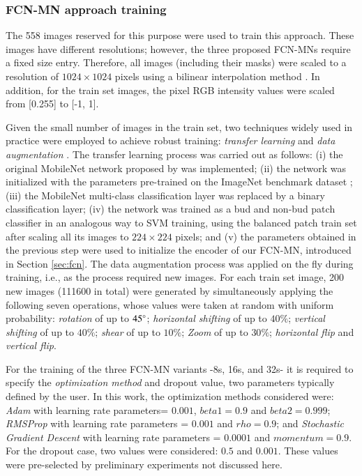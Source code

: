 \documentclass[a4paper,authoryear,review]{elsarticle}
\begin{document}
\subsubsection{FCN-MN approach training}
\label{sec:fcntrain}

The 558 images reserved for this purpose were used to train this approach. These images have different resolutions; however, the three proposed FCN-MNs require a fixed size entry. Therefore, all images (including their masks) were scaled to a resolution of $1024 \times 1024$ pixels using a bilinear interpolation method \citep{han2013comparison}. In addition, for the train set images, the pixel RGB intensity values were scaled from [0.255] to [-1, 1].

Given the small number of images in the train set, two techniques widely used in practice were employed to achieve robust training: \emph{transfer learning} \citet{pan2009survey} and \emph{data augmentation} \citet{shorten2019survey}. The transfer learning process was carried out as follows: (i) the original  MobileNet network proposed by \citet{howard2017mobilenets} was implemented; (ii) the network was initialized with the parameters pre-trained on the ImageNet benchmark dataset \citet{kornblith2019better}; (iii) the MobileNet multi-class classification layer was replaced by a binary classification layer; (iv) the network was trained as a bud and non-bud patch classifier in an analogous way to SVM training, using the balanced patch train set after scaling all its images to $224 \times 224$ pixels; and (v) the parameters obtained in the previous step were used to initialize the encoder of our FCN-MN, introduced in Section \ref{sec:fcn}. The data augmentation process was applied on the fly during training, i.e., as the process required new images. For each train set image, 200 new images (111600 in total) were generated by simultaneously applying the following seven operations, whose values were taken at random with uniform probability: \emph{rotation} of up to $45\degree$; \emph{horizontal shifting} of up to $40\%$; \emph{vertical shifting} of up to $40\%$; \emph{shear} of up to $10\%$; \emph{Zoom} of up to $30\%$;  \emph{horizontal flip} and \emph{vertical flip}. 

For the training of the three  FCN-MN variants -8s, 16s, and 32s- it is required to specify the \emph{optimization method} and dropout value, two parameters typically defined by the user. In this work, the optimization methods considered were: \emph{Adam} with learning rate parameters= $0.001$, $beta1 = 0.9$ and $beta2 = 0.999$; \emph{RMSProp} with learning rate parameters = $0.001$ and $rho = 0.9$; and \emph{Stochastic Gradient Descent} with learning rate parameters = $0.0001$ and $momentum = 0.9$. For the dropout case, two values were considered: $0.5$ and $0.001$. These values were pre-selected by preliminary experiments not discussed here.
\end{document}
